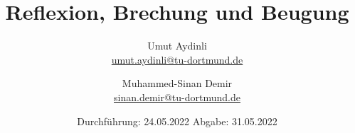 

\subject{V400}
\title{Reflexion, Brechung und Beugung}
\author{Umut Aydinli \\
 \href{mailto:umut.aydinli@tu-dortmund.de}{umut.aydinli@tu-dortmund.de}
 \and Muhammed-Sinan Demir \\
 \href{mailto:sinan.demir@tu-dortmund.de}{sinan.demir@tu-dortmund.de}
 }
\date{
  Durchführung: 24.05.2022
  \hspace{3em}
  Abgabe: 31.05.2022
}




\maketitle
\tableofcontents
\newpage









\nocite{*}
\printbibliography{}

